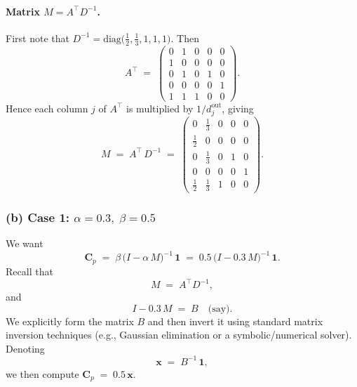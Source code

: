 \documentclass[a4paper,12pt]{article}
\begin{document}
\begin{enumerate}
\paragraph{Matrix $M = A^\top D^{-1}$.}
First note that $D^{-1} = \mathrm{diag}\!\bigl(\tfrac12,\tfrac13,1,1,1\bigr)$.
Then 
\[
A^\top \;=\;
\begin{pmatrix}
0 & 1 & 0 & 0 & 0\\
1 & 0 & 0 & 0 & 0\\
0 & 1 & 0 & 1 & 0\\
0 & 0 & 0 & 0 & 1\\
1 & 1 & 1 & 0 & 0
\end{pmatrix}.
\]
Hence each column $j$ of $A^\top$ is multiplied by $1/d_j^{\mathrm{out}}$, giving
\[
M \;=\; A^\top\,D^{-1} \;=\;
\begin{pmatrix}
0 & \tfrac{1}{3} & 0 & 0 & 0\\
\tfrac12 & 0 & 0 & 0 & 0\\
0 & \tfrac{1}{3} & 0 & 1 & 0\\
0 & 0 & 0 & 0 & 1\\
\tfrac12 & \tfrac{1}{3} & 1 & 0 & 0
\end{pmatrix}.
\]

\subsubsection*{(b) Case 1: \(\alpha = 0.3,\;\beta = 0.5\)}

We want
\[
\mathbf{C}_p
\;=\;
\beta \,\bigl(I - \alpha\,M\bigr)^{-1}\,\mathbf{1}
\;=\;
0.5 \,\bigl(I - 0.3\,M\bigr)^{-1}\,\mathbf{1}.
\]
Recall that
\[
M \;=\; A^\top D^{-1}, 
\]
and
\[
I - 0.3\,M \;=\; B
\quad\text{(say).}
\]
We explicitly form the matrix \(B\) and then invert it using standard matrix inversion techniques (e.g., Gaussian elimination or a symbolic/numerical solver). Denoting 
\[
\mathbf{x} \;=\; B^{-1}\,\mathbf{1},
\]
we then compute 
\(\mathbf{C}_p \;=\; 0.5\,\mathbf{x}.\)


\end{enumerate}
\end{document}
